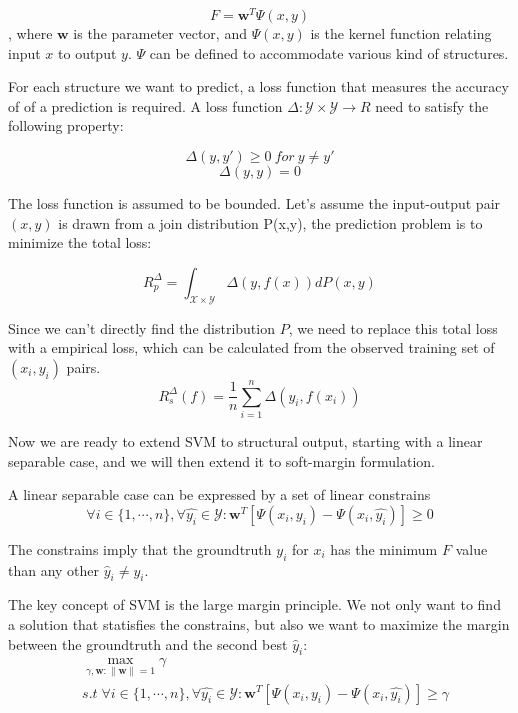 $$ F = \mathbf{w}^{T}\Psi(x,y)$$, 
where $\mathbf{w}$ is the parameter vector, and $\Psi(x,y)$ is the kernel function relating input $x$ to output $y$. $\Psi$ can be defined to accommodate various kind of structures. 

For each structure we want to predict, a loss function that measures the accuracy of of a prediction is required. A loss function $\Delta:\mathcal{Y}\times\mathcal{Y}\rightarrow R$ need to satisfy the following property:

$$\Delta(y, y') \geq 0 \ for\ y \neq y'$$
$$\Delta(y, y) = 0 $$

The loss function is assumed to be bounded. Let's assume the input-output pair $(x,y)$ is drawn from a join distribution P(x,y), the prediction problem is to minimize the total loss:

$$R_p^\Delta = \int_{\mathcal{X} \times \mathcal{Y}} \Delta (y, f(x))dP(x,y)$$

Since we can't directly find the distribution $P$, we need to replace this total loss with a empirical loss, which can be calculated from the observed training set of $(x_i, y_i)$ pairs.
$$R_s^\Delta(f) = \frac{1}{n}\sum^n_{i=1}\Delta(y_i, f(x_i))$$

Now we are ready to extend SVM to structural output, starting with a linear separable case, and we will then extend it to soft-margin formulation. 

A linear separable case can be expressed by a set of linear constrains
$$\forall i \in \{1,\cdots,n\}, \forall \hat{y_i}\in\mathcal{Y}: \mathbf{w}^T [\Psi(x_i, y_i) - \Psi(x_i, \hat{y_i})]\geq 0$$

The constrains imply that the groundtruth $y_i$ for $x_i$ has the minimum $F$ value than any other $\hat{y}_i \neq {y_i}$.

The key concept of SVM is the large margin principle. We not only want to find a solution that statisfies the constrains, but also we want to maximize the margin between the groundtruth and the second best $\hat{y}_i$:
$$
\begin{aligned}
& \max_{\gamma, \mathbf{w}:\|\mathbf{w}\| = 1} \gamma \\
& s.t \; \forall i \in \{1,\cdots,n\}, \forall \hat{y_i} \in\mathcal{Y}: \mathbf{w}^T [\Psi(x_i, y_i) - \Psi(x_i, \hat{y_i})] \geq \gamma\\
\end{aligned}
$$

